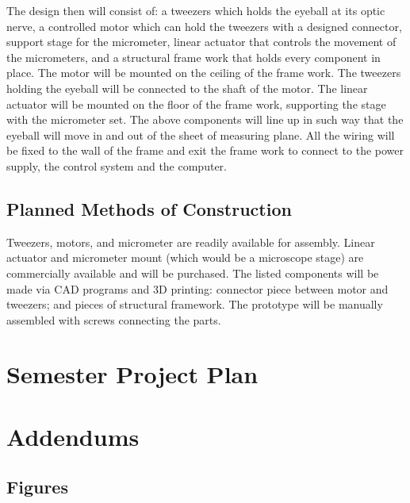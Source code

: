 \documentclass{article}
\begin{document}
The design then will consist of: a tweezers which holds the eyeball at its optic nerve, a controlled motor which can hold the tweezers with a designed connector, support stage for the micrometer, linear actuator that controls the movement of the micrometers, and a structural frame work that holds every component in place. The motor will be mounted on the ceiling of the frame work. The tweezers holding the eyeball will be connected to the shaft of the motor. The linear actuator will be mounted on the floor of the frame work, supporting the stage with the micrometer set. The above components will line up in such way that the eyeball will move in and out of the sheet of measuring plane. All the wiring will be fixed to the wall of the frame and exit the frame work to connect to the power supply, the control system and the computer.

\subsection{Planned Methods of Construction}
Tweezers, motors, and micrometer are readily available for assembly. Linear actuator and micrometer mount (which would be a microscope stage) are commercially available and will be purchased. The listed components will be made via CAD programs and 3D printing: connector piece between motor and tweezers; and pieces of structural framework. The prototype will be manually assembled with screws connecting the parts.

\section{Semester Project Plan}

\newpage


\newpage

\section{Addendums}
\label{sec:addendums}

\subsection{Figures}
\label{sec:figures}
\end{document}
